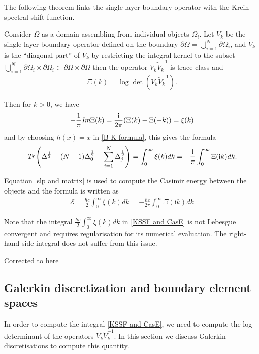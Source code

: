 The following theorem links the single-layer boundary operator with the Krein spectral shift function.
\begin{theorem}\cite{hanisch2020relative}
    Consider $\Omega$ as a domain assembling from individual objects $\Omega_{i}$. Let $V_{k}$ be the single-layer boundary operator defined on the boundary 
    $\partial\Omega = \bigcup_{i = 1}^{N}\partial\Omega_{i}$, and $\tilde{V}_{k}$ is the ``diagonal part'' of $V_{k}$ by restricting the integral 
    kernel to the subset $\bigcup_{i = 1}^{N}\partial\Omega_{i}\times\partial\Omega_{i}\subset\partial\Omega\times\partial\Omega$ then the operator 
    $V_{k}\tilde{V}_{k}^{-1}$ is trace-class and 
    \begin{align*}
        \Xi(k) = \log\det\left(V_{k}\tilde{V}_{k}^{-1}\right).
    \end{align*}

    Then for $k > 0$, we have 
    \begin{align*}
        -\frac{1}{\pi}\emph{\text{Im}}\Xi(k) = \frac{\mathrm{i}}{2\pi}(\Xi(k) - \Xi(-k)) = \xi(k)
    \end{align*}
    and by choosing $h(x) = x$ in \eqref{B-K formula}, this gives the formula 
    \begin{align}\label{slp and matrix}
        \emph{\text{Tr}}\left(\Delta^{\frac{1}{2}} + (N - 1)\Delta_{0}^{\frac{1}{2}} - \sum_{i = 1}^{N}\Delta_{j}^{\frac{1}{2}}\right)  = 
        \int_{0}^{\infty}\xi(k)dk = -\frac{1}{\pi}\int_{0}^{\infty}\Xi(\mathrm{i}k)dk.
    \end{align}
\end{theorem}

Equation \eqref{slp and matrix} is used to compute the Casimir energy between the objects and the formula is written as
\begin{align}\label{KSSF and CasE}
    \mathcal{E} = \frac{\hbar c}{2}\int_{0}^{\infty}\xi(k)dk = -\frac{\hbar c}{2\pi}\int_{0}^{\infty}\Xi(\mathrm{i}k)dk
\end{align}

\begin{remark}
    Note that the integral $\frac{\hbar c}{2}\int_{0}^{\infty}\xi(k)dk$ in \eqref{KSSF and CasE} is not Lebesgue convergent and requires regularisation for its numerical evaluation. The right-hand side integral does not suffer from this issue.
\end{remark}

{\color{red} Corrected to here}


\subsection{Galerkin discretization and boundary element spaces}
In order to compute the integral \eqref{KSSF and CasE}, we need to compute the log determinant of the operators $V_{k}\tilde{V}_{k}^{-1}$. In this section we discuss Galerkin discretisations to compute this quantity.


